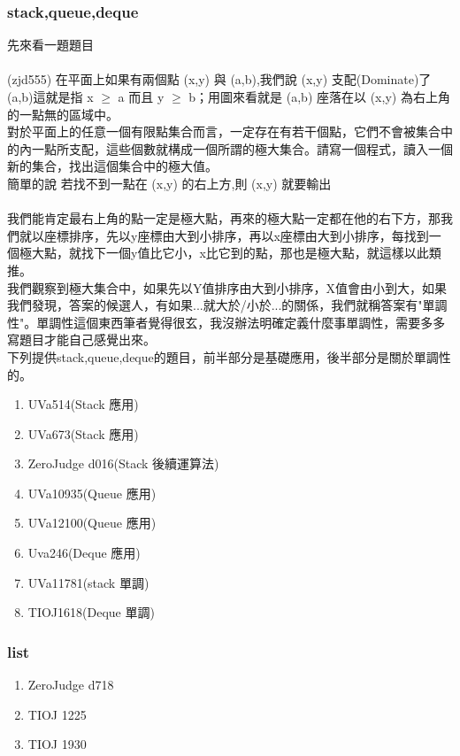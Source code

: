 \subsubsection{stack,queue,deque}
先來看一題題目\\ \\
(zjd555)
在平面上如果有兩個點 (x,y) 與 (a,b),我們說 (x,y) 支配(Dominate)了(a,b)這就是指 x $\geq$ a
而且 y $\geq$ b；用圖來看就是 (a,b) 座落在以 (x,y) 為右上角的一點無的區域中。\\ 
對於平面上的任意一個有限點集合而言，一定存在有若干個點，它們不會被集合中的內一點所支配，這些個數就構成一個所謂的極大集合。請寫一個程式，讀入一個新的集合，找出這個集合中的極大值。\\
簡單的說  若找不到一點在 (x,y) 的右上方,則 (x,y) 就要輸出\\ \\
我們能肯定最右上角的點一定是極大點，再來的極大點一定都在他的右下方，那我們就以座標排序，先以y座標由大到小排序，再以x座標由大到小排序，每找到一個極大點，就找下一個y值比它小，x比它到的點，那也是極大點，就這樣以此類推。\\
我們觀察到極大集合中，如果先以Y值排序由大到小排序，X值會由小到大，如果我們發現，答案的候選人，有如果...就大於/小於...的關係，我們就稱答案有"單調性"。單調性這個東西筆者覺得很玄，我沒辦法明確定義什麼事單調性，需要多多寫題目才能自己感覺出來。\\
下列提供stack,queue,deque的題目，前半部分是基礎應用，後半部分是關於單調性的。
\begin{enumerate}
\item UVa514(Stack 應用)
\item UVa673(Stack 應用)
\item ZeroJudge d016(Stack 後續運算法)
\item UVa10935(Queue 應用)
\item UVa12100(Queue 應用)
\item Uva246(Deque 應用)
\item UVa11781(stack 單調)
\item TIOJ1618(Deque 單調)
\end{enumerate}
\subsubsection{list}
\begin{enumerate}
\item ZeroJudge d718
\item TIOJ 1225
\item TIOJ 1930
\end{enumerate}
